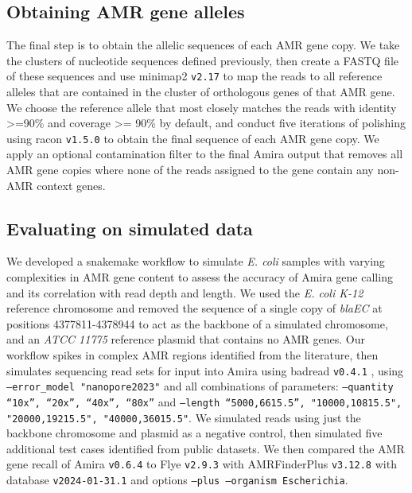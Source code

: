\subsection*{Obtaining AMR gene alleles}

The final step is to obtain the allelic sequences of each AMR gene copy. We take the clusters of nucleotide sequences defined previously, then create a FASTQ file of these sequences and use minimap2 \texttt{v2.17} \cite{10.1093/bioinformatics/bty191} to map the reads to all reference alleles that are contained in the cluster of orthologous genes of that AMR gene. We choose the reference allele that most closely matches the reads with identity >=90\% and coverage >= 90\% by default, and conduct five iterations of polishing using racon \texttt{v1.5.0} \cite{10.1101/gr.214270.116} to obtain the final sequence of each AMR gene copy. We apply an optional contamination filter to the final Amira output that removes all AMR gene copies where none of the reads assigned to the gene contain any non-AMR context genes.

\subsection*{Evaluating on simulated data}

We developed a snakemake \cite{10.1093/bioinformatics/bts480} workflow to simulate \textit{E. coli} samples with varying complexities in AMR gene content to assess the accuracy of Amira gene calling and its correlation with read depth and length. We used the \textit{E. coli K-12} reference chromosome and removed the sequence of a single copy of \textit{blaEC} at positions 4377811-4378944 to act as the backbone of a simulated chromosome, and an \textit{ATCC 11775} reference plasmid that contains no AMR genes. Our workflow spikes in complex AMR regions identified from the literature, then simulates sequencing read sets for input into Amira using badread \texttt{v0.4.1} \cite{Wick2019}, using \texttt{--error\_model "nanopore2023"} and all combinations of parameters: \texttt{--quantity “10x”, “20x”, “40x”, “80x”} and \texttt{--length “5000,6615.5”, "10000,10815.5", "20000,19215.5", "40000,36015.5"}. We simulated reads using just the backbone chromosome and plasmid as a negative control, then simulated five additional test cases identified from public datasets. We then compared the AMR gene recall of Amira \texttt{v0.6.4} to Flye \texttt{v2.9.3} with AMRFinderPlus \texttt{v3.12.8} \cite{Feldgarden2021} with database \texttt{v2024-01-31.1} and options \texttt{--plus --organism Escherichia}.

